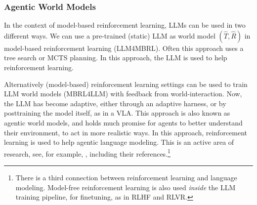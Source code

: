 \subsubsection{Agentic World Models}
In the context of model-based reinforcement learning, LLMs can be used in two different ways. We can use a pre-trained (static) LLM as world model $(\hat{T}, \hat{R})$ in model-based reinforcement learning (LLM4MBRL). Often this approach uses a tree search or MCTS planning. In this approach, the LLM is used to help reinforcement learning. 

Alternatively  (model-based) reinforcement learning settings can be used to train LLM world models (MBRL4LLM) with feedback from world-interaction. Now, the LLM has become adaptive, either through an adaptive harness, or by posttraining the model itself, as in a VLA. 
This approach is also known as agentic world models,
and holds much promise for agents to better understand their environment, to act in more realistic ways. In this approach, reinforcement learning is used to help agentic language modeling.  This is an active area of research, see, for example, 
\citet{zuo2026qwen}, including their references.\footnote{There is a third connection between reinforcement learning and language modeling. Model-free reinforcement learning is also used {\em inside} the LLM training pipeline, for finetuning, as in RLHF and RLVR.}  %


